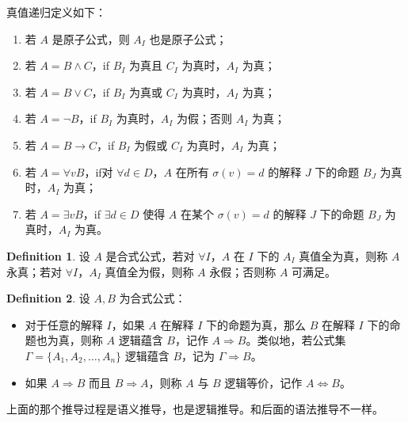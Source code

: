 \documentclass[oneside]{book}
\theoremstyle{definition}
\newtheorem{definition}{Definition}[section]
\begin{document}
真值递归定义如下：
  \begin{enumerate}
	\item 若 \( A \) 是原子公式，则 \( A_I \) 也是原子公式；
	\item 若 \( A = B \land C \)，if \( B_I \) 为真且 \( C_I \) 为真时，\( A_I \) 为真；
	\item 若 \( A = B \lor C \)，if \( B_I \) 为真或 \( C_I \) 为真时，\( A_I \) 为真；
	\item 若 \( A = \neg B \)，if \( B_I \) 为真时，\( A_I \) 为假；否则 \( A_I \) 为真；
	\item 若 \( A = B \to C \)，if \( B_I \) 为假或 \( C_I \) 为真时，\( A_I \) 为真；
	\item 若 \( A = \forall v B \)，if对 \( \forall d \in D \)，\( A \) 在所有 \( \sigma(v)=d \) 的解释 \( J \) 下的命题 \( B_J \) 为真时，\( A_I \) 为真；
	\item 若 \( A = \exists v B \)，if \( \exists d \in D \) 使得 \( A \) 在某个 \( \sigma(v)=d \) 的解释 \( J \) 下的命题 \( B_J \) 为真时，\( A_I \) 为真。
\end{enumerate}
\begin{definition}
	设 \( A \) 是合式公式，若对 \( \forall I \)，\( A \) 在 \( I \) 下的 \( A_I \) 真值全为真，则称 \( A \) 永真；若对 \( \forall I \)，\( A_I \) 真值全为假，则称 \( A \) 永假；否则称 \( A \) 可满足。
\end{definition}
	\begin{definition}
	设 \( A,B \) 为合式公式：
	\begin{itemize}
		\item 对于任意的解释 \( I \)，如果 \( A \) 在解释 \( I \) 下的命题为真，那么 \( B \) 在解释 \( I \) 下的命题也为真，则称 \( A \) 逻辑蕴含 \( B \)，记作 \( A \Rightarrow B \)。类似地，若公式集 \( \Gamma = \{ A_1,A_2,\dots,A_n \} \) 逻辑蕴含 \( B \)，记为 \( \Gamma \Rightarrow B \)。
		\item 如果 \( A \Rightarrow B \) 而且 \( B \Rightarrow A \)，则称 \( A \) 与 \( B \) 逻辑等价，记作 \( A \Leftrightarrow B \)。
	\end{itemize}
\end{definition}
上面的那个推导过程是语义推导，也是逻辑推导。和后面的语法推导不一样。
\end{document}
